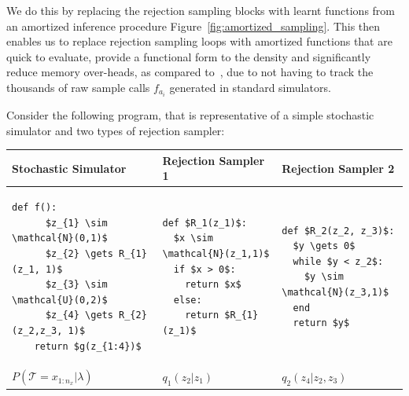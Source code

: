 \documentclass{article}
\begin{document}
We do this by replacing the rejection sampling blocks with 
learnt functions from an amortized inference procedure Figure~\ref{fig:amortized_sampling}.
This then enables us to replace rejection sampling loops with amortized functions that 
are quick to evaluate, provide a functional form to the density and significantly reduce 
memory over-heads, as compared to~\cite{baydin2018efficient}, due to not having to track the 
thousands of raw sample calls $f_{a_i}$ generated in standard simulators. 

Consider the following program, that is representative of a simple stochastic simulator
and two types of rejection sampler:


\noindent
\begin{tabular}{|p{3.6cm}|p{3.6cm}|p{3.6cm}|}
\hline
Stochastic Simulator  & Rejection Sampler 1 & Rejection Sampler 2 \\
\hline
\begin{lstlisting}[mathescape=true]
    def f():
      $z_{1} \sim \mathcal{N}(0,1)$
      $z_{2} \gets R_{1}(z_1, 1)$
      $z_{3} \sim \mathcal{U}(0,2)$
      $z_{4} \gets R_{2}(z_2,z_3, 1)$
    return $g(z_{1:4})$
\end{lstlisting}&
\begin{lstlisting}[mathescape=true]
def $R_1(z_1)$:
  $x \sim \mathcal{N}(z_1,1)$
  if $x > 0$:
    return $x$
  else:
    return $R_{1}(z_1)$
\end{lstlisting}&
\begin{lstlisting}[mathescape=true]
def $R_2(z_2, z_3)$:
  $y \gets 0$
  while $y < z_2$:
    $y \sim \mathcal{N}(z_3,1)$
  end
  return $y$
\end{lstlisting}\\
\hline
$P(\mathcal{T}= x_{1:n_x} | \lambda)$ & $q_{1}(z_{2} | z_{1})$ & $q_{2}(z_{4} |z_{2},z_{3})$ \\
\hline
\end{tabular} 
\end{document}
